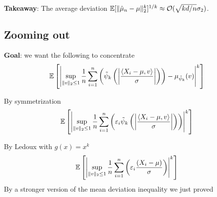 \textbf{Takeaway}: The average deviation $\mathbb{E}[\|\hat{\mu}_n - \mu\|_2^k]^{1/k} \approx \mathcal{O}(\sqrt{k d / n} \sigma_2)$.


\subsection{Zooming out}

\textbf{Goal}: we want the following to concentrate
\begin{align}
  \mathbb{E}\left[\left\lvert
      \sup_{\|v\|_2 \leq 1} \frac{1}{n} \sum_{i=1}^n \left(
        \tilde{\psi}_k\left(\left\lvert
            \frac{\braket{X_i - \mu, v}}{\sigma}
          \right\rvert\right)
      \right)
      - \mu_{\tilde{\psi}_k}(v)
    \right\rvert^k\right]
\end{align}

By symmetrization
\begin{align}
  \mathbb{E}\left[\left\lvert
      \sup_{\|v\|_2 \leq 1} \frac{1}{n} \sum_{i=1}^n \left(
        \varepsilon_i \tilde{\psi}_k\left(\left\lvert
            \frac{\braket{X_i - \mu, v}}{\sigma}
          \right\rvert\right)
      \right)
    \right\rvert^k\right]
\end{align}

By Ledoux with $g(x) = x^k$
\begin{align}
  \mathbb{E}\left[\left\lvert
      \sup_{\|v\|_2 \leq 1} \frac{1}{n} \sum_{i=1}^n \left(
        \varepsilon_i \frac{(X_i - \mu)}{\sigma}
      \right)
    \right\rvert^k\right]
\end{align}
By a stronger version of the mean deviation inequality we just proved
